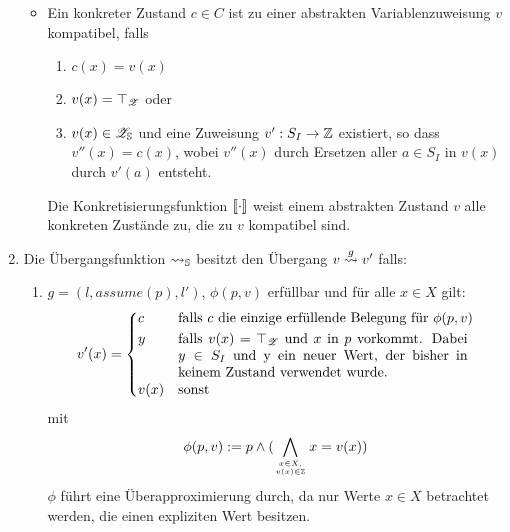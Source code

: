 \begin{enumerate}
\begin{itemize}
      \item Ein konkreter Zustand $c \in C$ ist zu einer abstrakten Variablenzuweisung $v$ kompatibel,
            falls
              \begin{enumerate}[1.]
                \item $c(x) = v(x)$
                \item $v(x) = \top_{\mathscr{Z}}$ oder
                \item $v(x) \in \mathscr{Z}_{\mathbb{S}}$ und eine Zuweisung $v': S_I \rightarrow \mathbb{Z}$ existiert, so dass $v''(x) = c(x)$, wobei $v''(x)$ durch Ersetzen aller $a \in S_I$ in $v(x)$ durch $v'(a)$ entsteht.
              \end{enumerate}

          Die Konkretisierungsfunktion $[\![ \cdot ]\!]$ weist einem abstrakten Zustand $v$ alle konkreten Zust\"ande zu, die zu $v$ kompatibel sind.
    \end{itemize}

  \item Die \"Ubergangsfunktion $\rightsquigarrow_{\mathbb{S}}$ besitzt den \"Ubergang $v \overset{g}{\rightsquigarrow} v'$ falls:
    \begin{enumerate}[1.]
      \item $g = (l, assume(p), l')$, $\phi (p, v)$ erf\"ullbar und f\"ur alle $x \in X$ gilt:
        \[
          v'(x) = \begin{dcases}
            c    & \text{falls $c$ die einzige erf\"ullende Belegung f\"ur $\phi (p, v)$}\\
            y    & \parbox[t]{.6\textwidth}{ falls $v(x) = \top_\valueset$ und $x$ in $p$ vorkommt. Dabei $y \in S_I$ und y ein neuer Wert, der bisher in keinem Zustand verwendet wurde.}\\
            v(x) & \text{sonst }              
          \end{dcases}
        \]
        mit \[\phi (p, v) := p \wedge (\displaystyle\bigwedge_{x \in X,\atop {v(x) \in \mathbb{Z}}} x = v(x))\]
        $\phi$ f\"uhrt eine \"Uberapproximierung durch, da nur Werte $x \in X$ betrachtet werden, die einen expliziten Wert besitzen.


\end{enumerate}
\end{enumerate}
